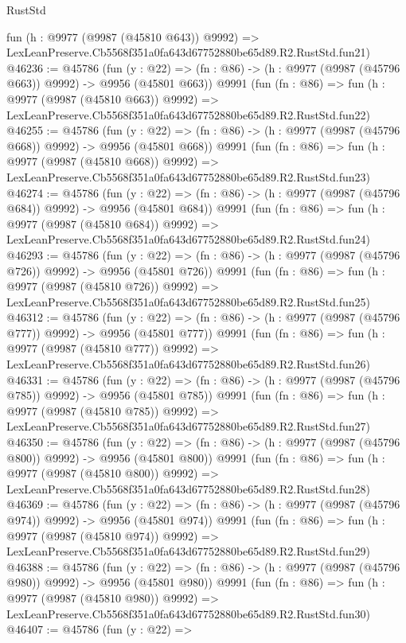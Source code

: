 \begin{lexlean}{RustStd}
\begin{coremodule}
    fun (h : @9977 (@9987 (@45810 @643)) @9992) =>
    LexLeanPreserve.Cb5568f351a0fa643d67752880be65d89.R2.RustStd.fun21)
@46236 := @45786
    (fun (y : @22) => (fn : @86) -> (h : @9977 (@9987 (@45796 @663)) @9992) -> @9956 (@45801 @663))
    @9991
    (fun (fn : @86) =>
    fun (h : @9977 (@9987 (@45810 @663)) @9992) =>
    LexLeanPreserve.Cb5568f351a0fa643d67752880be65d89.R2.RustStd.fun22)
@46255 := @45786
    (fun (y : @22) => (fn : @86) -> (h : @9977 (@9987 (@45796 @668)) @9992) -> @9956 (@45801 @668))
    @9991
    (fun (fn : @86) =>
    fun (h : @9977 (@9987 (@45810 @668)) @9992) =>
    LexLeanPreserve.Cb5568f351a0fa643d67752880be65d89.R2.RustStd.fun23)
@46274 := @45786
    (fun (y : @22) => (fn : @86) -> (h : @9977 (@9987 (@45796 @684)) @9992) -> @9956 (@45801 @684))
    @9991
    (fun (fn : @86) =>
    fun (h : @9977 (@9987 (@45810 @684)) @9992) =>
    LexLeanPreserve.Cb5568f351a0fa643d67752880be65d89.R2.RustStd.fun24)
@46293 := @45786
    (fun (y : @22) => (fn : @86) -> (h : @9977 (@9987 (@45796 @726)) @9992) -> @9956 (@45801 @726))
    @9991
    (fun (fn : @86) =>
    fun (h : @9977 (@9987 (@45810 @726)) @9992) =>
    LexLeanPreserve.Cb5568f351a0fa643d67752880be65d89.R2.RustStd.fun25)
@46312 := @45786
    (fun (y : @22) => (fn : @86) -> (h : @9977 (@9987 (@45796 @777)) @9992) -> @9956 (@45801 @777))
    @9991
    (fun (fn : @86) =>
    fun (h : @9977 (@9987 (@45810 @777)) @9992) =>
    LexLeanPreserve.Cb5568f351a0fa643d67752880be65d89.R2.RustStd.fun26)
@46331 := @45786
    (fun (y : @22) => (fn : @86) -> (h : @9977 (@9987 (@45796 @785)) @9992) -> @9956 (@45801 @785))
    @9991
    (fun (fn : @86) =>
    fun (h : @9977 (@9987 (@45810 @785)) @9992) =>
    LexLeanPreserve.Cb5568f351a0fa643d67752880be65d89.R2.RustStd.fun27)
@46350 := @45786
    (fun (y : @22) => (fn : @86) -> (h : @9977 (@9987 (@45796 @800)) @9992) -> @9956 (@45801 @800))
    @9991
    (fun (fn : @86) =>
    fun (h : @9977 (@9987 (@45810 @800)) @9992) =>
    LexLeanPreserve.Cb5568f351a0fa643d67752880be65d89.R2.RustStd.fun28)
@46369 := @45786
    (fun (y : @22) => (fn : @86) -> (h : @9977 (@9987 (@45796 @974)) @9992) -> @9956 (@45801 @974))
    @9991
    (fun (fn : @86) =>
    fun (h : @9977 (@9987 (@45810 @974)) @9992) =>
    LexLeanPreserve.Cb5568f351a0fa643d67752880be65d89.R2.RustStd.fun29)
@46388 := @45786
    (fun (y : @22) => (fn : @86) -> (h : @9977 (@9987 (@45796 @980)) @9992) -> @9956 (@45801 @980))
    @9991
    (fun (fn : @86) =>
    fun (h : @9977 (@9987 (@45810 @980)) @9992) =>
    LexLeanPreserve.Cb5568f351a0fa643d67752880be65d89.R2.RustStd.fun30)
@46407 := @45786
    (fun (y : @22) =>

\end{coremodule}
\end{lexlean}
